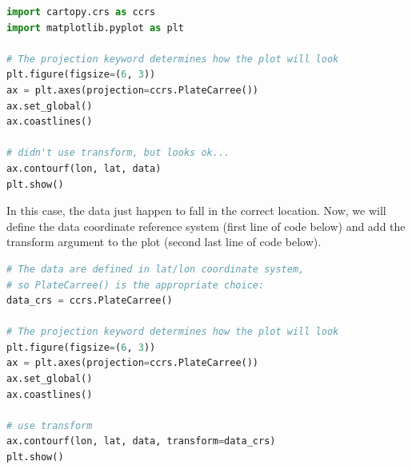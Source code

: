 \documentclass[a4paper , 12pt]{book}
\begin{document}
\begin{center}
\begin{lstlisting}[language=Python, frame=single]
import cartopy.crs as ccrs
import matplotlib.pyplot as plt

# The projection keyword determines how the plot will look
plt.figure(figsize=(6, 3))
ax = plt.axes(projection=ccrs.PlateCarree())
ax.set_global()
ax.coastlines()

# didn't use transform, but looks ok...
ax.contourf(lon, lat, data)  
plt.show()
\end{lstlisting}
\end{center}

In this case, the data just happen to fall in the correct location. Now, we will define the data coordinate reference system (first line of code below) and add the transform argument to the plot (second last line of code below).

\begin{center}
\begin{lstlisting}[language=Python, frame=single]
# The data are defined in lat/lon coordinate system, 
# so PlateCarree() is the appropriate choice:
data_crs = ccrs.PlateCarree()

# The projection keyword determines how the plot will look
plt.figure(figsize=(6, 3))
ax = plt.axes(projection=ccrs.PlateCarree())
ax.set_global()
ax.coastlines()

# use transform
ax.contourf(lon, lat, data, transform=data_crs) 
plt.show()
\end{lstlisting}
\end{center}
\end{document}
